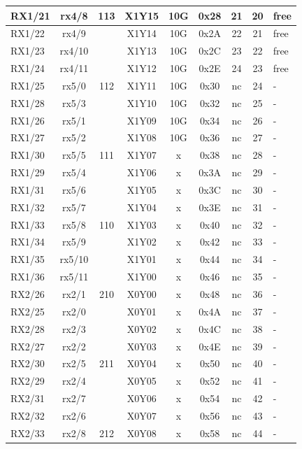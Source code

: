 \begin{longtable}{|l|c|c|c|c|c|c|c|l|}
RX1/21 & rx4/8  & 113 & X1Y15 & 10G & 0x28 & 21 & 20 & free\\\hline
RX1/22 & rx4/9  &     & X1Y14 & 10G & 0x2A & 22 & 21 & free\\\hline
RX1/23 & rx4/10 &     & X1Y13 & 10G & 0x2C & 23 & 22 & free\\\hline
RX1/24 & rx4/11 &     & X1Y12 & 10G & 0x2E & 24 & 23 & free\\\hline
RX1/25 & rx5/0  & 112 & X1Y11 & 10G & 0x30 & nc & 24 & -\\\hline
RX1/28 & rx5/3  &     & X1Y10 & 10G & 0x32 & nc & 25 & -\\\hline
RX1/26 & rx5/1  &     & X1Y09 & 10G & 0x34 & nc & 26 & -\\\hline
RX1/27 & rx5/2  &     & X1Y08 & 10G & 0x36 & nc & 27 & -\\\hline
RX1/30 & rx5/5  & 111 & X1Y07 &  x  & 0x38 & nc & 28 & -\\\hline
RX1/29 & rx5/4  &     & X1Y06 &  x  & 0x3A & nc & 29 & -\\\hline
RX1/31 & rx5/6  &     & X1Y05 &  x  & 0x3C & nc & 30 & -\\\hline
RX1/32 & rx5/7  &     & X1Y04 &  x  & 0x3E & nc & 31 & -\\\hline
RX1/33 & rx5/8  & 110 & X1Y03 &  x  & 0x40 & nc & 32 & -\\\hline
RX1/34 & rx5/9  &     & X1Y02 &  x  & 0x42 & nc & 33 & -\\\hline
RX1/35 & rx5/10 &     & X1Y01 &  x  & 0x44 & nc & 34 & -\\\hline
RX1/36 & rx5/11 &     & X1Y00 &  x  & 0x46 & nc & 35 & -\\\hline
RX2/26 & rx2/1  & 210 & X0Y00 &  x  & 0x48 & nc & 36 & -\\\hline        
RX2/25 & rx2/0  &     & X0Y01 &  x  & 0x4A & nc & 37 & -\\\hline        
RX2/28 & rx2/3  &     & X0Y02 &  x  & 0x4C & nc & 38 & -\\\hline        
RX2/27 & rx2/2  &     & X0Y03 &  x  & 0x4E & nc & 39 & -\\\hline   
RX2/30 & rx2/5  & 211 & X0Y04 &  x  & 0x50 & nc & 40 & -\\\hline   
RX2/29 & rx2/4  &     & X0Y05 &  x  & 0x52 & nc & 41 & -\\\hline   
RX2/31 & rx2/7  &     & X0Y06 &  x  & 0x54 & nc & 42 & -\\\hline   
RX2/32 & rx2/6  &     & X0Y07 &  x  & 0x56 & nc & 43 & -\\\hline   
RX2/33 & rx2/8  & 212 & X0Y08 &  x  & 0x58 & nc & 44 & -\\\hline   

\end{longtable}
